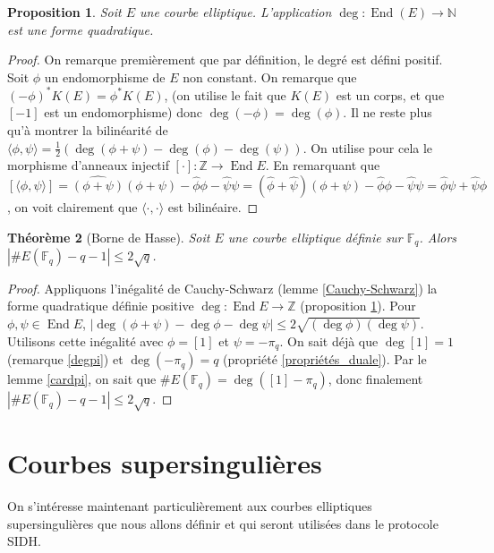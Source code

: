 \documentclass{article}
\theoremstyle{plain}%
\newtheorem{thm}{Théorème}[section]
\newtheorem{prop}[thm]{Proposition}
\theoremstyle{definition}%
\newcommand{\F}{\mathbb{F}}
\newcommand{\Z}{\mathbb{Z}}
\newcommand{\h}{\widehat}
\DeclareMathOperator{\End}{End}
\begin{document}
\begin{prop}
  \label{degré_quadratique}
  Soit $E$ une courbe elliptique. L'application $\deg : \End(E) \to \mathbb N$ est une forme quadratique.
\end{prop}

\begin{proof}
  On remarque premièrement que par définition, le degré est défini positif. Soit $\phi$ un endomorphisme de $E$ non constant. On remarque que $(-\phi)^*K(E) = \phi^*K(E)$, (on utilise le fait que $K(E)$ est un corps, et que $[-1]$ est un endomorphisme) donc $\deg(-\phi) = \deg(\phi)$. Il ne reste plus qu'à montrer la bilinéarité de $\langle \phi, \psi\rangle = \frac{1}{2}(\deg(\phi+\psi) - \deg(\phi) -\deg(\psi))$. On utilise pour cela le morphisme d'anneaux injectif $[\cdot] :\Z\to \End E$. En remarquant que $[\langle \phi, \psi\rangle] = \h{(\phi + \psi)}(\phi + \psi) - \h\phi\phi -\h\psi\psi =  (\h\phi + \h\psi)(\phi + \psi) - \h\phi\phi -\h\psi\psi = \h\phi\psi + \h\psi\phi$, on voit clairement que $\langle\cdot,\cdot\rangle$ est bilinéaire.
\end{proof}

\begin{thm}[Borne de Hasse]
  \label{hasse}
  Soit $E$ une courbe elliptique définie sur $\F_q$. Alors $|\#E(\F_q) - q -1|\le 2\sqrt{q}$.
\end{thm}

\begin{proof}
  Appliquons l'inégalité de Cauchy-Schwarz (lemme \ref{Cauchy-Schwarz})  la forme quadratique définie positive $\deg : \End E \to \Z$ (proposition \ref{degré_quadratique}). Pour $\phi, \psi\in \End E$, $|\deg(\phi+\psi) - \deg\phi -\deg\psi| \le 2\sqrt{(\deg\phi)(\deg\psi)}$. Utilisons cette inégalité avec $\phi = [1]$ et $\psi = -\pi_q$. On sait déjà que $\deg[1] = 1$ (remarque \ref{degpi}) et $\deg(-\pi_q) = q$ (propriété \ref{propriétés_duale}). 
  Par le lemme \ref{cardpi}, on sait que $\#E(\F_q) = \deg([1] - \pi_q)$, donc finalement $|\#E(\F_q)-q-1| \le 2\sqrt{q}$.
\end{proof}

\section{Courbes supersingulières}

On s'intéresse maintenant particulièrement aux courbes elliptiques supersingulières que nous allons définir et qui seront utilisées dans le protocole SIDH.
\end{document}
